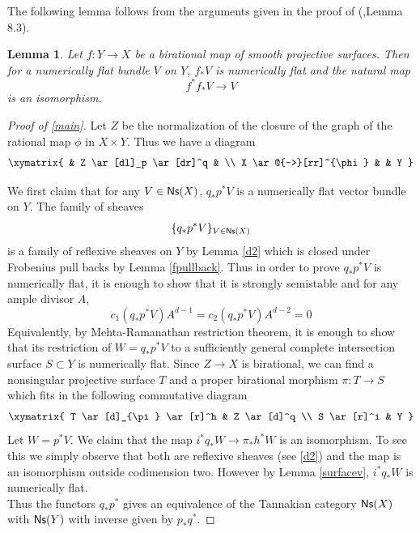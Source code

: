 \documentclass[12pt,oneside]{amsart}
\theoremstyle{plain}
\newtheorem{lem}[thm]{Lemma}
\theoremstyle{definition}
\begin{document}
The following lemma follows from the arguments given in the proof of (\cite{langer1},Lemma $8.3$). 

\begin{lem}\label{surfacev}
Let $f:Y\to X$ be a birational map of smooth projective surfaces. Then for a numerically flat bundle $V$ on $Y$, $f_*V$ is numerically flat and the natural map $$ f^*f_*V \to V$$ is an isomorphism. 
\end{lem}


\begin{proof}[Proof of \ref{main}]
Let $Z$ be the normalization of the closure of the graph of the rational map $\phi$ in $X\times Y$. Thus we have a diagram 
$$\xymatrix{
& Z \ar[dl]_p \ar[dr]^q &  \\
X \ar@{-->}[rr]^{\phi} & & Y 
}$$

We first claim that for any $V\in {\sf Ns}(X)$, $q_*p^*V$ is a numerically flat vector bundle on $Y$. The family of sheaves 
$$\{q_*p^*V\}_{V\in {\sf Ns}(X)}$$
is a family of reflexive sheaves on $Y$ by Lemma \eqref{d2} which is closed under Frobenius pull backs by Lemma \eqref{fpullback}. Thus in order to prove $q_*p^*V$ is numerically flat, it is enough to show that it is strongly semistable and for any ample divisor $A$, 
$$ c_1(q_*p^*V)A^{d-1}=c_2(q_*p^*V)A^{d-2} =0 $$
Equivalently, by Mehta-Ramanathan restriction theorem, it is enough to show that its restriction of $W=q_*p^*V$ to a sufficiently general complete intersection surface $S\subset Y$ is numerically flat. Since $Z\to X$ is birational, we can find a nonsingular projective surface $T$ and a proper birational morphism $\pi:T\to S$ which fits in the following commutative diagram
$$\xymatrix{
T \ar[d]_{\pi} \ar[r]^h & Z \ar[d]^q \\
S \ar[r]^i & Y
}$$
Let $W=p^*V$. We claim that the map $i^*q_*W \to \pi_*h^*W$ is an isomorphism. To see this we simply observe that both are reflexive sheaves (see \eqref{d2}) and the map is an isomorphism outside codimension two. However by Lemma \eqref{surfacev}, $i^*q_*W$ is numerically flat. \\

Thus the functors $q_*p^*$ gives an equivalence of the Tannakian category ${\sf Ns}(X)$ with ${\sf Ns}(Y)$ with inverse given by $p_*q^*$. 
\end{proof}


\end{document}
